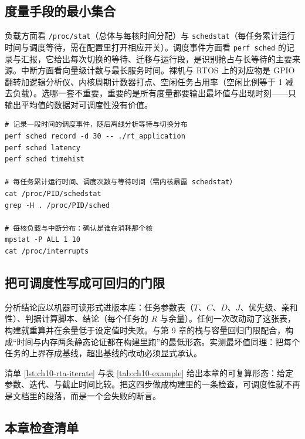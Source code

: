 \documentclass[12pt,a4paper,fontset=fandol]{ctexbook}
\newcommand{\Lang}[1]{\textsf{#1}}
\newcommand{\DomRtos}{\Lang{RTOS}}
\begin{document}
\subsection*{度量手段的最小集合}

负载方面看 \texttt{/proc/stat}（总体与每核时间分配）与 \texttt{schedstat}（每任务累计运行时间与调度等待，需在配置里打开相应开关）。调度事件方面看 \texttt{perf sched} 的记录与汇报，它给出每次切换的等待、迁移与运行段，是识别抢占与长等待的主要来源。中断方面看向量级计数与最长服务时间。裸机与 \DomRtos{} 上的对应物是 GPIO 翻转加逻辑分析仪、内核周期计数器打点、空闲任务占用率（空闲比例等于 1 减去负载）。选哪一套不重要，重要的是所有度量都要输出最坏值与出现时刻——只输出平均值的数据对可调度性没有价值。

\begin{lstlisting}[style=shellstyle,caption={Shell：调度延迟与切换热点的采集},label={lst:ch10-measure}]
# 记录一段时间的调度事件，随后离线分析等待与切换分布
perf sched record -d 30 -- ./rt_application
perf sched latency
perf sched timehist

# 每任务累计运行时间、调度次数与等待时间（需内核暴露 schedstat）
cat /proc/PID/schedstat
grep -H . /proc/PID/sched

# 每核负载与中断分布：确认是谁在消耗那个核
mpstat -P ALL 1 10
cat /proc/interrupts
\end{lstlisting}

\subsection*{把可调度性写成可回归的门限}

分析结论应以机器可读形式进版本库：任务参数表（$T$、$C$、$D$、$J$、优先级、亲和性）、判据计算脚本、结论（每个任务的 $R$ 与余量）。任何一次改动动了这张表，构建就重算并在余量低于设定值时失败。与第 9 章的栈与容量回归门限配合，构成“时间与内存两条静态论证都在构建里跑”的最低形态。实测最坏值同理：把每个任务的上界存成基线，超出基线的改动必须显式承认。

清单 \ref{lst:ch10-rta-iterate} 与表 \ref{tab:ch10-example} 给出本章的可复算形态：给定参数、迭代、与截止时间比较。把这四步做成构建里的一条检查，可调度性就不再是文档里的段落，而是一个会失败的断言。

\subsection*{本章检查清单}
\end{document}
